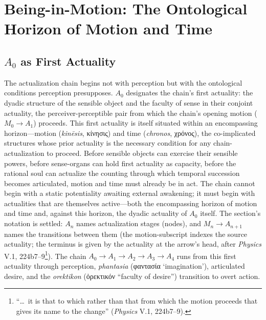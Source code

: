 \documentclass{article}
\newcommand{\gk}[1]{{\greekfont #1}}
\begin{document}
\section{Being-in-Motion: The Ontological Horizon of Motion and Time}

\subsection{$A_0$ as First Actuality}

The actualization chain begins not with perception but with the ontological conditions perception presupposes. $A_0$ designates the chain's first actuality: the dyadic structure of the sensible object and the faculty of sense in their conjoint actuality, the perceiver-perceptible pair from which the chain's opening motion ($M_0 \rightarrow A_1$) proceeds. This first actuality is itself situated within an encompassing horizon---motion (\textit{kinēsis}, \gk{κίνησις}) and time (\textit{chronos}, \gk{χρόνος}), the co-implicated structures whose prior actuality is the necessary condition for any chain-actualization to proceed. Before sensible objects can exercise their sensible powers, before sense-organs can hold first actuality as capacity, before the rational soul can actualize the counting through which temporal succession becomes articulated, motion and time must already be in act. The chain cannot begin with a static potentiality awaiting external awakening; it must begin with actualities that are themselves active---both the encompassing horizon of motion and time and, against this horizon, the dyadic actuality of $A_0$ itself. The section's notation is settled: $A_n$ names actualization stages (nodes), and $M_n \rightarrow A_{n+1}$ names the transitions between them (the motion-subscript indexes the source actuality; the terminus is given by the actuality at the arrow's head, after \textit{Physics} V.1, 224b7--9\footnote{``\ldots\ it is that to which rather than that from which the motion proceeds that gives its name to the change'' (\textit{Physics} V.1, 224b7--9).}). The chain $A_0 \rightarrow A_1 \rightarrow A_2 \rightarrow A_3 \rightarrow A_4$ runs from this first actuality through perception, \textit{phantasia} (\gk{φαντασία} `imagination'), articulated desire, and the \textit{orektikon} (\gk{ὀρεκτικόν} ``faculty of desire'') transition to overt action.
\end{document}
